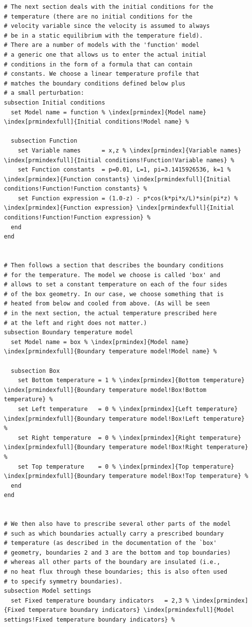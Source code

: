 \documentclass{article}
\begin{document}
\begin{lstlisting}[frame=single,language=prmfile,escapechar=\%]
# The next section deals with the initial conditions for the
# temperature (there are no initial conditions for the
# velocity variable since the velocity is assumed to always
# be in a static equilibrium with the temperature field).
# There are a number of models with the 'function' model
# a generic one that allows us to enter the actual initial
# conditions in the form of a formula that can contain
# constants. We choose a linear temperature profile that
# matches the boundary conditions defined below plus
# a small perturbation:
subsection Initial conditions
  set Model name = function % \index[prmindex]{Model name} \index[prmindexfull]{Initial conditions!Model name} %

  subsection Function
    set Variable names      = x,z % \index[prmindex]{Variable names} \index[prmindexfull]{Initial conditions!Function!Variable names} %
    set Function constants  = p=0.01, L=1, pi=3.1415926536, k=1 % \index[prmindex]{Function constants} \index[prmindexfull]{Initial conditions!Function!Function constants} %
    set Function expression = (1.0-z) - p*cos(k*pi*x/L)*sin(pi*z) % \index[prmindex]{Function expression} \index[prmindexfull]{Initial conditions!Function!Function expression} %
  end
end


# Then follows a section that describes the boundary conditions
# for the temperature. The model we choose is called 'box' and
# allows to set a constant temperature on each of the four sides
# of the box geometry. In our case, we choose something that is
# heated from below and cooled from above. (As will be seen
# in the next section, the actual temperature prescribed here
# at the left and right does not matter.)
subsection Boundary temperature model
  set Model name = box % \index[prmindex]{Model name} \index[prmindexfull]{Boundary temperature model!Model name} %

  subsection Box
    set Bottom temperature = 1 % \index[prmindex]{Bottom temperature} \index[prmindexfull]{Boundary temperature model!Box!Bottom temperature} %
    set Left temperature   = 0 % \index[prmindex]{Left temperature} \index[prmindexfull]{Boundary temperature model!Box!Left temperature} %
    set Right temperature  = 0 % \index[prmindex]{Right temperature} \index[prmindexfull]{Boundary temperature model!Box!Right temperature} %
    set Top temperature    = 0 % \index[prmindex]{Top temperature} \index[prmindexfull]{Boundary temperature model!Box!Top temperature} %
  end
end


# We then also have to prescribe several other parts of the model
# such as which boundaries actually carry a prescribed boundary
# temperature (as described in the documentation of the `box'
# geometry, boundaries 2 and 3 are the bottom and top boundaries)
# whereas all other parts of the boundary are insulated (i.e.,
# no heat flux through these boundaries; this is also often used
# to specify symmetry boundaries).
subsection Model settings
  set Fixed temperature boundary indicators   = 2,3 % \index[prmindex]{Fixed temperature boundary indicators} \index[prmindexfull]{Model settings!Fixed temperature boundary indicators} %


\end{lstlisting}
\end{document}
